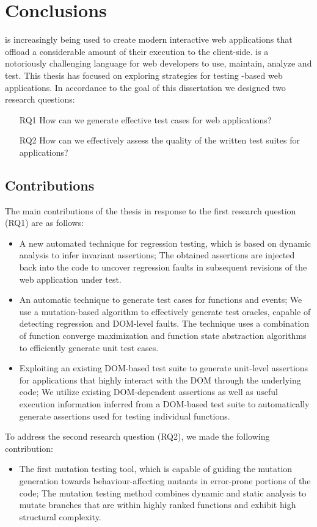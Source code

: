 \chapter{Conclusions} \label{Chap:conc}
\javascript is increasingly being used to create modern interactive web applications that offload a considerable amount of their execution to the client-side. \javascript is a notoriously challenging language for web developers to use, maintain, analyze and test. This thesis has focused on exploring strategies for testing \javascript-based web applications. In accordance to the goal of this dissertation we designed two research questions:
\begin{itemize}
\item [RQ1] How can we generate effective test cases for \javascript web applications?
\item [RQ2] How can we effectively assess the quality of the written test suites for \javascript applications?
\end{itemize}
\section{Contributions}
The main contributions of the thesis in response to the first research question (RQ1) are as follows: 
\begin{itemize}
\item A new automated technique for \javascript regression testing, which is based on dynamic analysis to infer invariant assertions; The obtained assertions are injected back into the \javascript code to uncover regression faults in subsequent revisions of the web application under test. 
\item An automatic technique to generate test cases for \javascript functions and events; We use a mutation-based algorithm to effectively generate test oracles, capable of detecting regression \javascript and DOM-level faults. The technique uses a combination of function converge maximization and function state abstraction algorithms to efficiently generate unit test cases.
\item Exploiting an existing DOM-based test suite to generate unit-level assertions for applications that highly interact with the DOM through the underlying \javascript code; We utilize
existing DOM-dependent assertions as well as useful execution information inferred from a DOM-based test suite to automatically generate assertions used for testing individual \javascript functions.
\end{itemize}
To address the second research question (RQ2), we made the following contribution:
\begin{itemize}
\item The first \javascript mutation testing tool, which is capable of guiding the mutation generation towards behaviour-affecting mutants in error-prone portions of the code; The mutation testing method combines dynamic and static analysis to mutate branches that are within highly ranked functions and exhibit high structural complexity.
\end{itemize}
